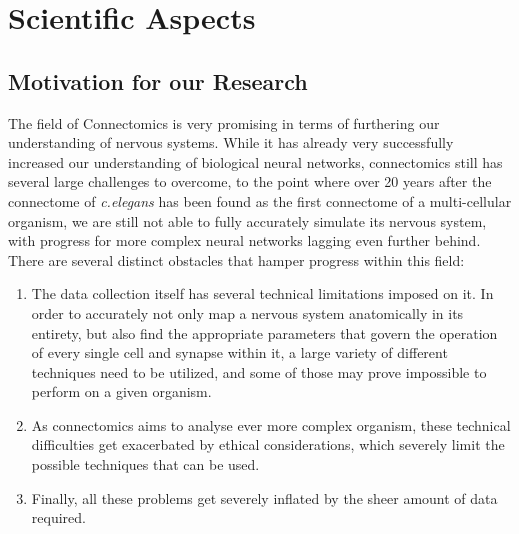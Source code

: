 \documentclass[a4paper,11pt]{article}
\begin{document}
\newpage
%
%
\vspace{\baselineskip}
\vspace*{10mm}
\tableofcontents
\newpage
%
%
\section{Scientific Aspects}
\subsection{Motivation for our Research}

The field of Connectomics is very promising in terms of furthering our understanding of nervous systems. While it has already very successfully increased our understanding of biological neural networks, connectomics still has several large challenges to overcome, to the point where over 20 years after the connectome of \emph{c.elegans} has been found as the first connectome of a multi-cellular organism, we are still not able to fully accurately simulate its nervous system, with progress for more complex neural networks lagging even further behind. There are several distinct obstacles that hamper progress within this field:
\begin{enumerate}
\item The data collection itself has several technical limitations imposed on it. In order to accurately not only map a nervous system anatomically in its entirety, but also find the appropriate parameters that govern the operation of every single cell and synapse within it, a large variety of different techniques need to be utilized, and some of those may prove impossible to perform on a given organism.
\item As connectomics aims to analyse ever more complex organism, these technical difficulties get exacerbated by ethical considerations, which severely limit the possible techniques that can be used.
\item Finally, all these problems get severely inflated by the sheer amount of data required.
\end{enumerate}
\end{document}
